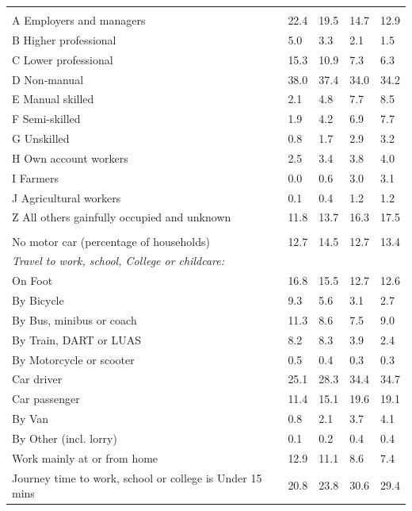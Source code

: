\documentclass{article}
\begin{document}
\begin{table}[h]
\begin{tabular}{KTTTT}
\hline
    \\ 
    \hline
A Employers and managers & 22.4& 19.5& 14.7& 12.9\\
B Higher professional & 5.0& 3.3& 2.1& 1.5\\
C Lower professional & 15.3& 10.9&  7.3&  6.3\\
D Non-manual & 38.0& 37.4& 34.0& 34.2\\
E Manual skilled & 2.1& 4.8& 7.7& 8.5\\
F Semi-skilled & 1.9& 4.2& 6.9& 7.7\\
G Unskilled & 0.8& 1.7& 2.9& 3.2\\
H Own account workers & 2.5& 3.4& 3.8& 4.0\\
I Farmers & 0.0& 0.6& 3.0& 3.1\\
J Agricultural workers & 0.1& 0.4& 1.2& 1.2\\
Z All others gainfully occupied and unknown & 11.8& 13.7& 16.3& 17.5\\
\hline
{}\hline
    \\ 
    \hline
No motor car (percentage of households) & 12.7& 14.5& 12.7& 
13.4\\
    \hline 
\emph{Travel to work, school, College or childcare:} & & & \\
\quad On Foot & 16.8& 15.5& 12.7& 12.6\\ 
\quad By Bicycle & 9.3& 5.6& 3.1& 2.7\\ 
\quad By Bus, minibus or coach & 11.3&  8.6&  7.5&  9.0\\
\quad By Train, DART or LUAS & 8.2& 8.3& 3.9& 2.4\\
\quad By Motorcycle or scooter & 0.5& 0.4& 0.3& 0.3\\
\quad Car driver & 25.1 & 28.3& 34.4& 34.7\\
\quad Car passenger & 11.4& 15.1& 19.6& 19.1\\
\quad By Van & 0.8& 2.1& 3.7& 4.1\\
\quad By Other (incl. lorry) & 0.1& 0.2& 0.4& 0.4\\
    \hline
Work mainly at or from home & 12.9& 11.1&  8.6&  7.4\\
Journey time to work, school or college is Under 15 mins & 20.8& 23.8& 30.6& 29.4\\

\end{tabular}
\end{table}
\end{document}

